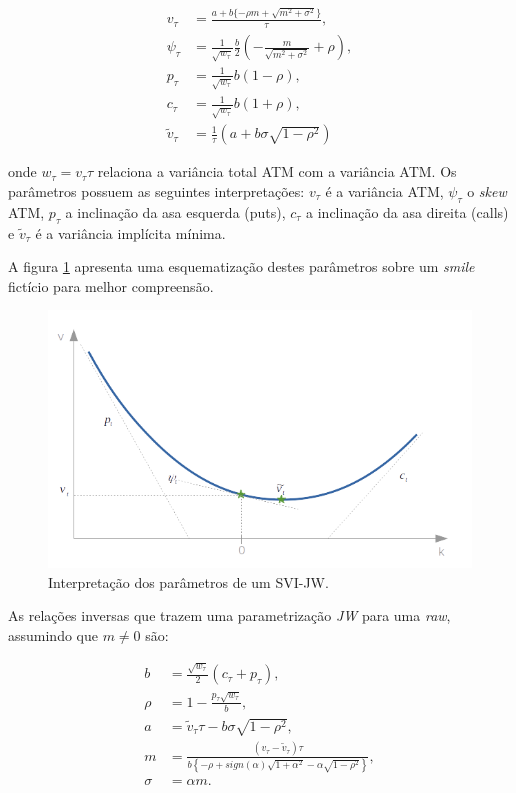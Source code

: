 \documentclass[]{book}
\theoremstyle{definition}
\theoremstyle{definition}
\theoremstyle{definition}
\theoremstyle{remark}
\begin{document}
\begin{align}
v_\tau&=\frac{a+b\{-\rho m + \sqrt{m^2+\sigma^2}\}}{\tau},\\
\psi_\tau&=\frac{1}{\sqrt{w_\tau}}\frac{b}{2}\left(-\frac{m}{\sqrt{m^2+\sigma^2}}+\rho\right),\\
p_\tau&=\frac{1}{\sqrt{w_\tau}}b(1-\rho),\\
c_\tau&=\frac{1}{\sqrt{w_\tau}}b(1+\rho),\\
\tilde v_\tau&=\frac{1}{\tau}\left(a+b\sigma\sqrt{1-\rho^2}\right)
\label{eq:raw-to-jw}
\end{align}

onde \(w_\tau=v_\tau \tau\) relaciona a variância total ATM com a
variância ATM. Os parâmetros possuem as seguintes interpretações:
\(v_\tau\) é a variância ATM, \(\psi_\tau\) o \emph{skew} ATM,
\(p_\tau\) a inclinação da asa esquerda (puts), \(c_\tau\) a inclinação
da asa direita (calls) e \(\tilde v_\tau\) é a variância implícita
mínima.

A figura \ref{fig:svi-jw} apresenta uma esquematização destes parâmetros
sobre um \emph{smile} fictício para melhor compreensão.

\begin{figure}
\centering
\includegraphics{./images/svi_jw.png}
\caption{\label{fig:svi-jw}Interpretação dos parâmetros de um SVI-JW.}
\end{figure}

As relações inversas que trazem uma parametrização \emph{JW} para uma
\emph{raw}, assumindo que \(m \neq 0\) são:

\begin{align}
b&=\frac{\sqrt{w_\tau}}{2}(c_\tau+p_\tau),\\
\rho&=1-\frac{p_\tau\sqrt{w_\tau}}{b},\\
a&=\tilde v_\tau \tau-b\sigma\sqrt{1-\rho^2},\\
m&=\frac{(v_\tau-\tilde v_\tau)\tau}{b\left\lbrace-\rho+sign(\alpha)\sqrt{1+\alpha^2}-\alpha\sqrt{1-\rho^2}\right\rbrace},\\
\sigma&=\alpha m.
\label{eq:jw-to-raw}
\end{align}
\end{document}
